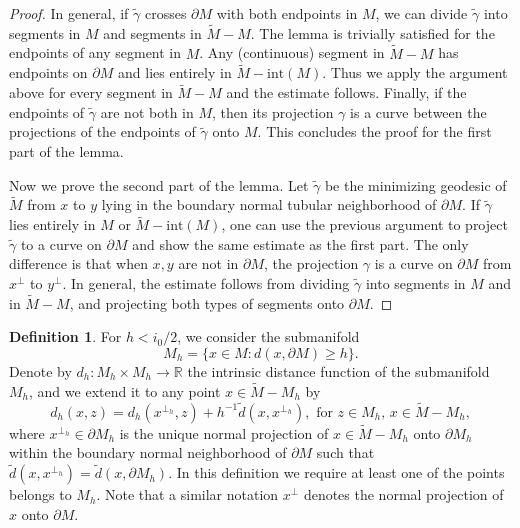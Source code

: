\documentclass[11pt,letterpaper]{amsart}
\numberwithin{equation}{section}
\theoremstyle{definition}
\theoremstyle{plain}
\theoremstyle{definition}
\theoremstyle{plain}
\theoremstyle{definition}
\newtheorem{definition}[main1]{Definition}
\theoremstyle{plain}
\begin{document}
\begin{proof}
In general, if $\widetilde{\gamma}$ crosses $\partial M$ with both endpoints in $M$, we can divide $\widetilde{\gamma}$ into segments in $M$ and segments in $\widetilde{M}-M$. The lemma is trivially satisfied for the endpoints of any segment in $M$. Any (continuous) segment in $\widetilde{M}-M$ has endpoints on $\partial M$ and lies entirely in $\widetilde{M}-\textrm{int}(M)$. Thus we apply the argument above for every segment in $\widetilde{M}-M$ and the estimate follows. Finally, if the endpoints of $\widetilde{\gamma}$ are not both in $M$, then its projection $\gamma$ is a curve between the projections of the endpoints of $\widetilde{\gamma}$ onto $M$. This concludes the proof for the first part of the lemma.

Now we prove the second part of the lemma. Let $\widetilde{\gamma}$ be the minimizing geodesic of $\widetilde{M}$ from $x$ to $y$ lying in the boundary normal tubular neighborhood of $\partial M$. If $\widetilde{\gamma}$ lies entirely in $M$ or $\widetilde{M}-\textrm{int}(M)$, one can use the previous argument to project $\widetilde{\gamma}$ to a curve on $\partial M$ and show the same estimate as the first part. The only difference is that when $x,y$ are not in $\partial M$, the projection $\gamma$ is a curve on $\partial M$ from $x^{\perp}$ to $y^{\perp}$. In general, the estimate follows from dividing $\widetilde{\gamma}$ into segments in $M$ and in $\widetilde{M}-M$, and projecting both types of segments onto $\partial M$.
\end{proof}

\begin{definition}\label{Mhdh}
For $h<i_0/2$, we consider the submanifold
$$M_{h}=\big\{x\in M: d(x, \partial M)\geqslant h \big\}.$$
Denote by $d_h:M_h\times M_h \to \mathbb{R}$ the intrinsic distance function of the submanifold $M_h$, and we extend it to any point $x\in \widetilde{M}-M_h$ by 
\begin{equation}\label{dh}
d_h (x,z)=d_h (x^{\perp_h},z)+h^{-1}\widetilde{d}(x,x^{\perp_h}), \textrm{ for }z\in M_h,\, x\in \widetilde{M}-M_h,
\end{equation}
where $x^{\perp_h}\in \partial M_h$ is the unique normal projection of $x\in \widetilde{M}-M_h$ onto $\partial M_h$ within the boundary normal neighborhood of $\partial M$ such that $\widetilde{d}(x,x^{\perp_h})=\widetilde{d}(x,\partial M_h)$. In this definition we require at least one of the points belongs to $M_h$. Note that a similar notation $x^{\perp}$ denotes the normal projection of $x$ onto $\partial M$.
\end{definition}
\end{document}
